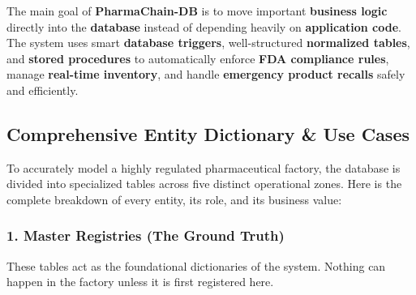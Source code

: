 \documentclass[12pt, a4paper]{article}
\begin{document}
The main goal of \textbf{PharmaChain-DB} is to move important \textbf{business logic} directly into the \textbf{database} instead of depending heavily on \textbf{application code}. The system uses smart \textbf{database triggers}, well-structured \textbf{normalized tables}, and \textbf{stored procedures} to automatically enforce \textbf{FDA compliance rules}, manage \textbf{real-time inventory}, and handle \textbf{emergency product recalls} safely and efficiently.


\subsection{Comprehensive Entity Dictionary \& Use Cases}
To accurately model a highly regulated pharmaceutical factory, the database is divided into specialized tables across five distinct operational zones. Here is the complete breakdown of every entity, its role, and its business value:

\subsubsection*{1. Master Registries (The Ground Truth)}
These tables act as the foundational dictionaries of the system. Nothing can happen in the factory unless it is first registered here.
\end{document}
